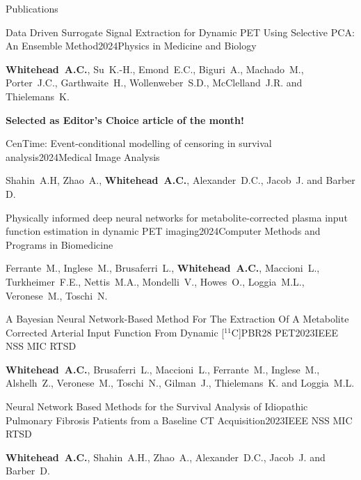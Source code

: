 \documentclass{cv}
\begin{document}
    \begin{rSection}{Publications}
        \item \begin{rSubsection}{Data Driven Surrogate Signal Extraction for Dynamic PET Using Selective PCA: An Ensemble Method}{2024}{Physics in Medicine and Biology}{}
            \item {\bf Whitehead~A.C.}, Su~K.-H., Emond~E.C., Biguri~A., Machado~M., Porter~J.C., Garthwaite~H., Wollenweber~S.D., McClelland~J.R. and Thielemans~K. \\

            \item {\bf Selected as Editor’s Choice article of the month!} \\
        \end{rSubsection}
        
        \item \begin{rSubsection}{CenTime: Event-conditional modelling of censoring in survival analysis}{2024}{Medical Image Analysis}{}
            \item Shahin~A.H, Zhao~A., {\bf Whitehead~A.C.}, Alexander~D.C., Jacob~J. and Barber D.
        \end{rSubsection}

        \item \begin{rSubsection}{Physically informed deep neural networks for metabolite-corrected plasma input function estimation in dynamic PET imaging}{2024}{Computer Methods and Programs in Biomedicine}{}
            \item Ferrante~M., Inglese~M., Brusaferri~L., {\bf Whitehead~A.C.}, Maccioni~L., Turkheimer~F.E., Nettis~M.A., Mondelli~V., Howes~O., Loggia~M.L., Veronese~M., Toschi~N.
        \end{rSubsection}

        \item \begin{rSubsection}{A Bayesian Neural Network-Based Method For The Extraction Of A Metabolite Corrected Arterial Input Function From Dynamic [$^{11}$C]PBR28 PET}{2023}{IEEE NSS MIC RTSD}{}
            \item {\bf Whitehead~A.C.}, Brusaferri~L., Maccioni~L., Ferrante~M., Inglese~M., Alshelh~Z., Veronese~M., Toschi~N., Gilman~J., Thielemans~K. and Loggia~M.L.
        \end{rSubsection}

        \item \begin{rSubsection}{Neural Network Based Methods for the Survival Analysis of Idiopathic Pulmonary Fibrosis Patients from a Baseline CT Acquisition}{2023}{IEEE NSS MIC RTSD}{}
            \item {\bf Whitehead~A.C.}, Shahin~A.H., Zhao~A., Alexander~D.C., Jacob~J. and Barber~D.
        \end{rSubsection}
        

\end{rSection}
\end{document}
